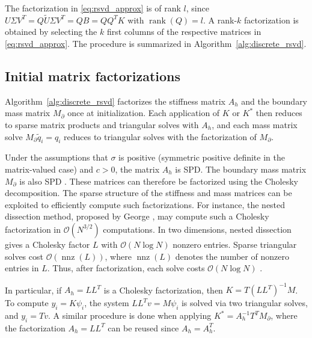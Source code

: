 The factorization in \eqref{eq:rsvd_approx} is of rank $l$, since $U \Sigma V^T = Q \tilde U \Sigma V^T = Q B = Q Q^T K$ with $\operatorname{rank}(Q) = l$. A rank-$k$ factorization is obtained by selecting the $k$ first columns of the respective matrices in \eqref{eq:rsvd_approx}. The procedure is summarized in Algorithm~\ref{alg:discrete_rsvd}.



\subsection{Initial matrix factorizations}\label{sec:initial_matrix_factorizations}
Algorithm~\ref{alg:discrete_rsvd} factorizes the stiffness matrix $A_h$ and the boundary mass matrix $M_\partial$ once at initialization. Each application of $K$ or $K^*$ then reduces to sparse matrix products and triangular solves with $A_h$, and each mass matrix solve $M_\partial \tilde{q}_i = q_i$ reduces to triangular solves with the factorization of $M_\partial$.

Under the assumptions that $\sigma$ is positive (symmetric positive definite in the matrix-valued case) and $c > 0$, the matrix $A_h$ is SPD. The boundary mass matrix $M_\partial$ is also SPD \cite{larsonFiniteElementMethod2013}. These matrices can therefore be factorized using the Cholesky decomposition. The sparse structure of the stiffness and mass matrices can be exploited to efficiently compute such factorizations. For instance, the nested dissection method, proposed by George \cite{georgeNestedDissectionRegular1973}, may compute such a Cholesky factorization in $\mathcal{O}(N^{3/2})$ computations. In two dimensions, nested dissection gives a Cholesky factor $L$ with $\mathcal{O}(N \log N)$ nonzero entries. Sparse triangular solves cost $\mathcal{O}(\operatorname{nnz}(L))$, where $\operatorname{nnz}(L)$ denotes the number of nonzero entries in $L$. Thus, after factorization, each solve costs $\mathcal{O}(N \log N)$ \cite{georgeComputerSolutionLarge1984,liptonGeneralizedNestedDissection1979}.

In particular, if $A_h = LL^T$ is a Cholesky factorization, then $K = T (LL^T)^{-1}M$. To compute $y_i = K \psi_i$, the system $LL^T v = M \psi_i$ is solved via two triangular solves, and $y_i = T v$. A similar procedure is done when applying $K^* = A_h^{-1}T^TM_\partial$, where the factorization $A_h = LL^T$ can be reused since $A_h = A_h^T$.
